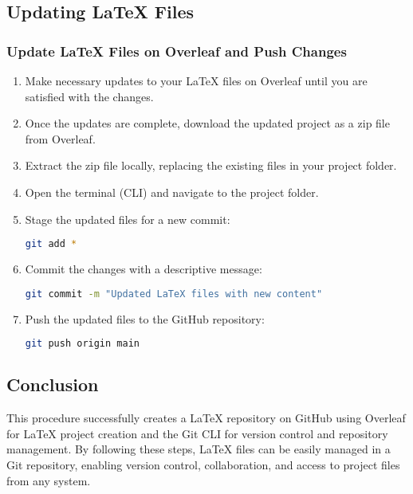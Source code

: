 \subsection{Updating LaTeX Files}
\subsubsection{Update LaTeX Files on Overleaf and Push Changes}

\begin{enumerate}
    \item Make necessary updates to your LaTeX files on Overleaf until you are satisfied with the changes.
    \item Once the updates are complete, download the updated project as a zip file from Overleaf.
    \item Extract the zip file locally, replacing the existing files in your project folder.
    \item Open the terminal (CLI) and navigate to the project folder.
    \item Stage the updated files for a new commit:
    \begin{lstlisting}[language=bash]
    git add *
    \end{lstlisting}
    \item Commit the changes with a descriptive message:
    \begin{lstlisting}[language=bash]
    git commit -m "Updated LaTeX files with new content"
    \end{lstlisting}
    \item Push the updated files to the GitHub repository:
    \begin{lstlisting}[language=bash]
    git push origin main
    \end{lstlisting}
\end{enumerate}


\subsection{Conclusion}
This procedure successfully creates a LaTeX repository on GitHub using Overleaf for LaTeX project creation and the Git CLI for version control and repository management. By following these steps, LaTeX files can be easily managed in a Git repository, enabling version control, collaboration, and access to project files from any system.


